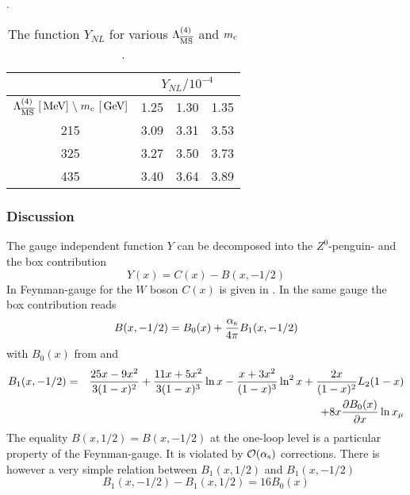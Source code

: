 \begin{table}[htb]
\caption[]{The function $Y_{NL}$ for various $\Lambda_{\overline{\rm MS}}^{(4)}$ and $m_{\rm c}$.
\label{tab:ynlnum}}.
\begin{center}
\begin{tabular}{|c|c|c|c|}
&\multicolumn{3}{c|}{$Y_{NL}/10^{-4}$}\\
\hline
$\Lms^{(4)}\ [\mev]\;\backslash\;\mc\ [\gev]$ & 1.25 & 1.30 & 1.35 \\
\hline
215 & 3.09 & 3.31 & 3.53 \\
325 & 3.27 & 3.50 & 3.73 \\
435 & 3.40 & 3.64 & 3.89
\end{tabular}
\end{center}
\end{table}

\subsubsection{Discussion}
               \label{sec:HeffRareKB:klmm:disc}
The gauge independent function $Y$ can be decomposed into the
$Z^0$-penguin- and the box contribution
\begin{equation}\label{yxcb}  Y(x)=C(x)-B(x, -1/2)    \end{equation}
In Feynman-gauge for the $W$ boson $C(x)$ is given in .
In the same gauge the box contribution reads
\begin{equation}\label{bx01m}
B(x,-1/2)=B_0(x)+{\alpha_{\rm s}\over 4\pi} B_1(x,-1/2)
\end{equation}
with $B_0(x)$ from  and
\begin{eqnarray}\label{bx1m}
B_1(x, -1/2)&=&{25x-9x^2\over 3(1-x)^2}
+ {11x + 5x^2\over 3(1-x)^3}\ln x
- {x+3x^2\over(1-x)^3} \ln^2x + {2x\over (1-x)^2}L_2(1-x)\nonumber \\
& &+ 8x {\partial B_0(x)\over \partial x} \ln x_\mu
\end{eqnarray}
The equality $B(x,1/2)=B(x,-1/2)$ at the one-loop level is a
particular property of the Feynman-gauge. It is violated by
${\cal O}(\alpha_{\rm s})$ corrections. There is however a very simple
relation between $B_1(x,1/2)$ and $B_1(x,-1/2)$
\begin{equation}\label{b1pm}
B_1(x, -1/2)- B_1(x, 1/2) = 16 B_0(x)   \end{equation}

